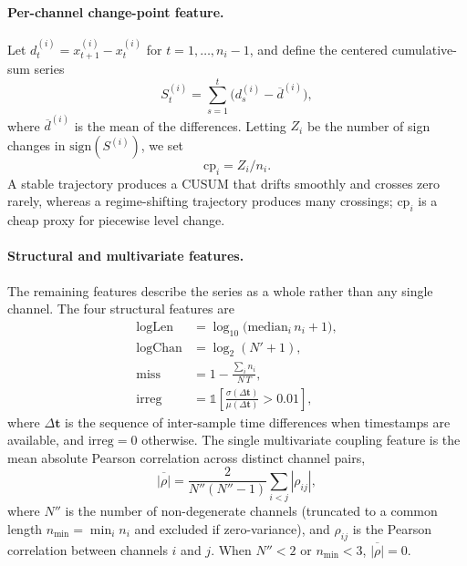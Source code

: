 \paragraph{Per-channel change-point feature.}
Let $d^{(i)}_t = x^{(i)}_{t+1} - x^{(i)}_t$ for $t = 1, \ldots, n_i-1$,
and define the centered cumulative-sum series
\begin{equation}
    S^{(i)}_t = \textstyle\sum_{s=1}^{t}
                 \big( d^{(i)}_s - \overline{d}^{(i)} \big),
\end{equation}
where $\overline{d}^{(i)}$ is the mean of the differences. Letting
$Z_i$ be the number of sign changes in $\mathrm{sign}(S^{(i)})$, we set
\begin{equation}
    \mathrm{cp}_i = Z_i / n_i.
\end{equation}
A stable trajectory produces a CUSUM that drifts smoothly and crosses
zero rarely, whereas a regime-shifting trajectory produces many
crossings; $\mathrm{cp}_i$ is a cheap proxy for piecewise level change.

\paragraph{Structural and multivariate features.}
The remaining features describe the series as a whole rather than any
single channel. The four structural features are
\begin{align}
\mathrm{logLen}   &= \log_{10}\!\big(\mathrm{median}_i\, n_i + 1\big), \\
\mathrm{logChan}  &= \log_2(N' + 1), \\
\mathrm{miss}     &= 1 - \frac{\sum_i n_i}{N\,T}, \\
\mathrm{irreg}    &= \mathbb{1}\!\left[
                       \frac{\sigma(\Delta\mathbf{t})}{\mu(\Delta\mathbf{t})}
                       > 0.01 \right],
\end{align}
where $\Delta\mathbf{t}$ is the sequence of inter-sample time
differences when timestamps are available, and $\mathrm{irreg} = 0$
otherwise. The single multivariate coupling feature is the mean
absolute Pearson correlation across distinct channel pairs,
\begin{equation}
    \overline{|\rho|}
    = \frac{2}{N''(N''-1)} \textstyle\sum_{i<j} |\rho_{ij}|,
\end{equation}
where $N''$ is the number of non-degenerate channels (truncated to a
common length $n_{\min} = \min_i n_i$ and excluded if zero-variance),
and $\rho_{ij}$ is the Pearson correlation between channels $i$ and
$j$. When $N'' < 2$ or $n_{\min} < 3$, $\overline{|\rho|} = 0$.

